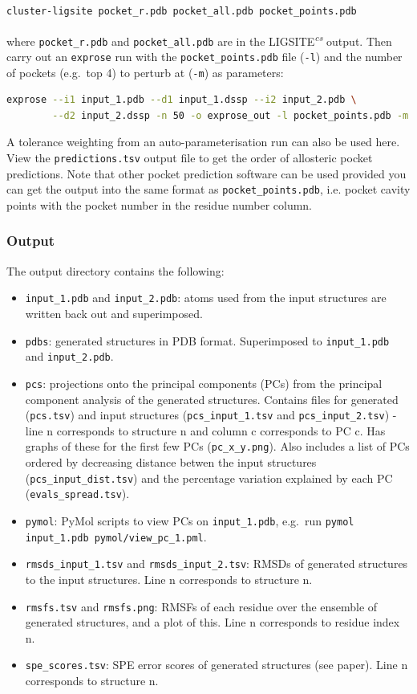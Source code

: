 \begin{lstlisting}[language=bash]
    cluster-ligsite pocket_r.pdb pocket_all.pdb pocket_points.pdb
\end{lstlisting}

where \verb|pocket_r.pdb| and \verb|pocket_all.pdb| are in the LIGSITE\textsuperscript{\it cs} output. Then carry out an \verb|exprose| run with the \verb|pocket_points.pdb| file (\verb|-l|) and the number of pockets (e.g.\ top 4) to perturb at (\verb|-m|) as parameters:

\begin{lstlisting}[language=bash]
    exprose --i1 input_1.pdb --d1 input_1.dssp --i2 input_2.pdb \
        --d2 input_2.dssp -n 50 -o exprose_out -l pocket_points.pdb -m 4
\end{lstlisting}

A tolerance weighting from an auto-parameterisation run can also be used here. View the \verb|predictions.tsv| output file to get the order of allosteric pocket predictions. Note that other pocket prediction software can be used provided you can get the output into the same format as \verb|pocket_points.pdb|, i.e. pocket cavity points with the pocket number in the residue number column.


\subsubsection{Output}

The output directory contains the following:
\begin{itemize}
\item \verb|input_1.pdb| and \verb|input_2.pdb|: atoms used from the input structures are written back out and superimposed.
\item \verb|pdbs|: generated structures in PDB format. Superimposed to \verb|input_1.pdb| and \verb|input_2.pdb|.
\item \verb|pcs|: projections onto the principal components (PCs) from the principal component analysis of the generated structures. Contains files for generated (\verb|pcs.tsv|) and input structures (\verb|pcs_input_1.tsv| and \verb|pcs_input_2.tsv|) - line n corresponds to structure n and column c corresponds to PC c. Has graphs of these for the first few PCs (\verb|pc_x_y.png|). Also includes a list of PCs ordered by decreasing distance betwen the input structures (\verb|pcs_input_dist.tsv|) and the percentage variation explained by each PC (\verb|evals_spread.tsv|).
\item \verb|pymol|: PyMol scripts to view PCs on \verb|input_1.pdb|, e.g.\ run \verb|pymol input_1.pdb pymol/view_pc_1.pml|.
\item \verb|rmsds_input_1.tsv| and \verb|rmsds_input_2.tsv|: RMSDs of generated structures to the input structures. Line n corresponds to structure n.
\item \verb|rmsfs.tsv| and \verb|rmsfs.png|: RMSFs of each residue over the ensemble of generated structures, and a plot of this. Line n corresponds to residue index n.
\item \verb|spe_scores.tsv|: SPE error scores of generated structures (see paper). Line n corresponds to structure n.
\end{itemize}


